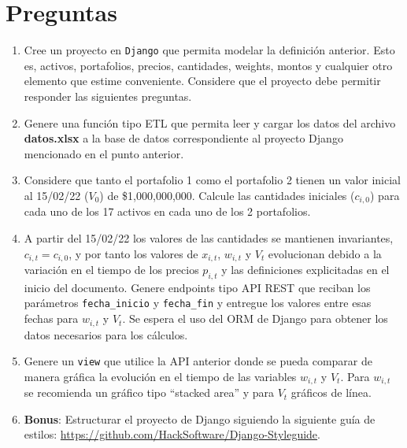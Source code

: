 \documentclass{article}
\newcommand{\keyword}[1]{\colorbox{gray!15}{\textcolor{red!70!black}{\texttt{#1}}}}
\newcommand{\codevar}[1]{\colorbox{gray!15}{\texttt{#1}}}
\begin{document}
\section*{Preguntas}

\begin{enumerate}
    \item Cree un proyecto en \keyword{Django} que permita modelar la definición anterior. Esto es, activos, portafolios, precios, cantidades, weights, montos y cualquier otro elemento que estime conveniente. Considere que el proyecto debe permitir responder las siguientes preguntas.
    \item Genere una función tipo ETL que permita leer y cargar los datos del archivo \textbf{datos.xlsx} a la base de datos correspondiente al proyecto Django mencionado en el punto anterior.
    \item Considere que tanto el portafolio 1 como el portafolio 2 tienen un valor inicial al 15/02/22 ($V_0$) de \$1,000,000,000. Calcule las cantidades iniciales ($c_{i,0}$) para cada uno de los 17 activos en cada uno de los 2 portafolios.
    \item A partir del 15/02/22 los valores de las cantidades se mantienen invariantes, $c_{i,t} = c_{i,0}$, y por tanto los valores de $x_{i,t}$, $w_{i,t}$ y $V_t$ evolucionan debido a la variación en el tiempo de los precios $p_{i,t}$ y las definiciones explicitadas en el inicio del documento. Genere endpoints tipo API REST que reciban los parámetros \codevar{fecha\_inicio} y \codevar{fecha\_fin} y entregue los valores entre esas fechas para $w_{i,t}$ y $V_t$. Se espera el uso del ORM de Django para obtener los datos necesarios para los cálculos.
    \item Genere un \codevar{view} que utilice la API anterior donde se pueda comparar de manera gráfica la evolución en el tiempo de las variables $w_{i,t}$ y $V_t$. Para $w_{i,t}$ se recomienda un gráfico tipo ``stacked area'' y para $V_t$ gráficos de línea.
    \item \textbf{Bonus}: Estructurar el proyecto de Django siguiendo la siguiente guía de estilos: \url{https://github.com/HackSoftware/Django-Styleguide}.
\end{enumerate}
\end{document}
